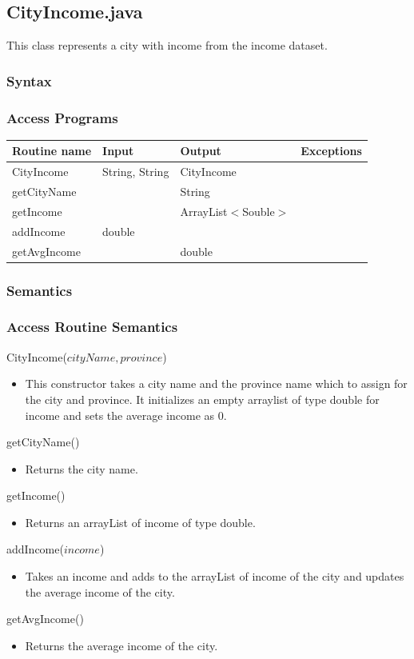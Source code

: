 \documentclass[12pt,fleqn]{article}
\begin{document}

\subsection*{CityIncome.java}\label{cityincome}
This class represents a city with income from the income dataset.
\subsubsection* {Syntax}

\subsubsection* {Access Programs}
\begin{tabular}{| l | l | l | l |}
\hline
\textbf{Routine name} & \textbf{Input} & \textbf{Output} & \textbf{Exceptions}\\
\hline
CityIncome & String, String & CityIncome & ~\\
\hline
getCityName & ~ & String & ~\\
\hline
getIncome & ~ & ArrayList$<$Souble$>$ & ~\\
\hline
addIncome & double & ~ & ~\\
\hline
getAvgIncome & ~ & double & ~\\
\hline
\end{tabular}

\subsubsection*{Semantics}
\subsubsection*{Access Routine Semantics}
\noindent CityIncome($cityName, province$)
\begin{itemize}
\item This constructor takes a city name and the province name which to assign for the city and province. It
initializes an empty arraylist of type double for income and sets the average income as 0.
\end{itemize}
\noindent getCityName()
\begin{itemize}
\item Returns the city name.
\end{itemize}
\noindent getIncome()
\begin{itemize}
\item Returns an arrayList of income of type double.
\end{itemize}
\noindent addIncome($income$)
\begin{itemize}
\item Takes an income and adds to the arrayList of income of the city and updates the average income of the
city.
\end{itemize}
\noindent getAvgIncome()
\begin{itemize}
\item Returns the average income of the city.
\end{itemize}
\end{document}
